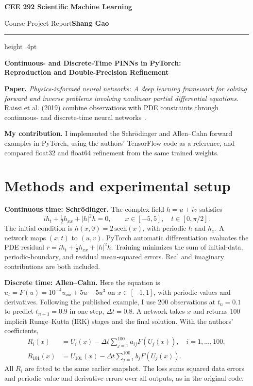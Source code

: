 \documentclass[11pt,letterpaper]{article}
\begin{document}
\thispagestyle{plain}
{\centering\bfseries\fontsize{16}{19}\selectfont CEE 292 Scientific Machine Learning\par}
\vspace{5pt}
{Course Project Report\hfill\textbf{Shang Gao}\par}
\vspace{4pt}\hrule height .4pt\vspace{9pt}
{\color{ink}\bfseries\fontsize{17}{21}\selectfont Continuous- and Discrete-Time PINNs in PyTorch:\\Reproduction and Double-Precision Refinement\par}
\vspace{6pt}
\textbf{Paper.} \emph{Physics-informed neural networks: A deep learning framework for solving forward and inverse problems involving nonlinear partial differential equations}. Raissi et al. (2019) combine observations with PDE constraints through continuous- and discrete-time neural networks~\cite{raissi}.

\textbf{My contribution.} I implemented the Schr\"odinger and Allen--Cahn forward examples in PyTorch, using the authors' TensorFlow code as a reference, and compared float32 and float64 refinement from the same trained weights.

\section{Methods and experimental setup}
\textbf{Continuous time: Schr\"odinger.} The complex field $h=u+iv$ satisfies
\begin{equation}
 i h_t+\tfrac12 h_{xx}+|h|^2h=0,\qquad x\in[-5,5],\quad t\in[0,\pi/2].
\end{equation}
The initial condition is $h(x,0)=2\,\mathrm{sech}(x)$, with periodic $h$ and $h_x$. A network maps $(x,t)$ to $(u,v)$. PyTorch automatic differentiation evaluates the PDE residual $r=i h_t+\tfrac12h_{xx}+|h|^2h$. Training minimizes the sum of initial-data, periodic-boundary, and residual mean-squared errors. Real and imaginary contributions are both included.

\textbf{Discrete time: Allen--Cahn.} Here the equation is $u_t=F(u)=10^{-4}u_{xx}+5u-5u^3$ on $x\in[-1,1]$, with periodic values and derivatives. Following the published example, I use 200 observations at $t_n=0.1$ to predict $t_{n+1}=0.9$ in one step, $\Delta t=0.8$. A network takes $x$ and returns 100 implicit Runge--Kutta (IRK) stages and the final solution. With the authors' coefficients,
\begin{equation}
\begin{aligned}
 R_i(x)&=U_i(x)-\Delta t\sum_{j=1}^{100}a_{ij}F(U_j(x)),\quad i=1,\ldots,100,\\
 R_{101}(x)&=U_{101}(x)-\Delta t\sum_{j=1}^{100}b_jF(U_j(x)).
\end{aligned}
\end{equation}
All $R_i$ are fitted to the same earlier snapshot. The loss sums squared data errors and periodic value and derivative errors over all outputs, as in the original code.
\end{document}
